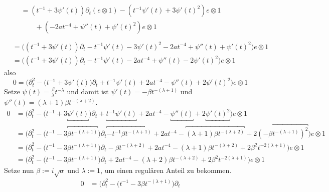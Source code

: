 \begin{try}
\begin{align*}
\\&\begin{aligned}
    &= (t^{-1} + 3\psi'(t))\partial_t (e\otimes 1)
    - (t^{-1} \psi'(t) + 3\psi'(t)^2)e\otimes 1
  \\&\qquad + (- 2at^{-4} + \psi''(t) + \psi'(t)^2) e\otimes 1
\\\end{aligned}
\\&= \Big((t^{-1} + 3\psi'(t))\partial_t
    - t^{-1} \psi'(t) - 3\psi'(t)^2 - 2at^{-4} + \psi''(t)
    + \psi'(t)^2\Big) e\otimes 1
\\&= \Big((t^{-1} + 3\psi'(t))\partial_t
    - t^{-1} \psi'(t) - 2at^{-4} + \psi''(t)
    - 2 \psi'(t)^2\Big) e\otimes 1
\end{align*}
also
\[
0 = \Big(\partial_t^2 - \big(t^{-1} + 3\psi'(t)\big)\partial_t
    + t^{-1} \psi'(t) + 2at^{-4} -\psi''(t)
    + 2 \psi'(t)^2\Big) e\otimes 1
\]
Setze $\psi(t)=\frac{\beta}{\lambda}t^{-\lambda}$ und damit ist 
$\psi'(t)=-\beta t^{-(\lambda+1)}$ und
$\psi''(t)=(\lambda+1)\beta t^{-(\lambda+2)}$.
\begin{align*}
0 &= \Big(\partial_t^2 - \big(t^{-1} + 3\underbracket{\psi'(t)}\big)\partial_t
   + \underbracket{t^{-1} \psi'(t)} + 2at^{-4} -\underbracket{\psi''(t)}
   + 2 \underbracket{\psi'(t)^2}\Big) e\otimes 1
\\&= \Big(\partial_t^2 - \big(t^{-1} 
   - 3\overbracket{\beta t^{-(\lambda+1)}}\big)\partial_t
   \overbracket{- t^{-1} \beta t^{-(\lambda+1)}} + 2at^{-4} 
   - \overbracket{(\lambda+1)\beta t^{-(\lambda+2)}}
   + 2 \overbracket{(-\beta t^{-(\lambda+1)})^2}\Big) e\otimes 1
\\&= \Big(\partial_t^2 - \big(t^{-1} - 3\beta t^{-(\lambda+1)}\big)\partial_t
   - \beta t^{-(\lambda+2)} + 2at^{-4} - (\lambda+1)\beta t^{-(\lambda+2)}
   + 2 \beta^2 t^{-2(\lambda+1)}\Big) e\otimes 1
\\&= \Big(\partial_t^2 - \big(t^{-1} - 3\beta t^{-(\lambda+1)}\big)\partial_t
   + 2at^{-4} - (\lambda+2)\beta t^{-(\lambda+2)}
   + 2 \beta^2 t^{-2(\lambda+1)}\Big) e\otimes 1
\end{align*}
Setze nun $\beta:=i\sqrt{a}$ und $\lambda:=1$, um einen regulären Anteil zu
bekommen.
\begin{align*}
0 &= \Big(\partial_t^2 - \big(t^{-1} - 3\beta t^{-(\lambda+1)}\big)\partial_t

\end{align*}
\end{try}
